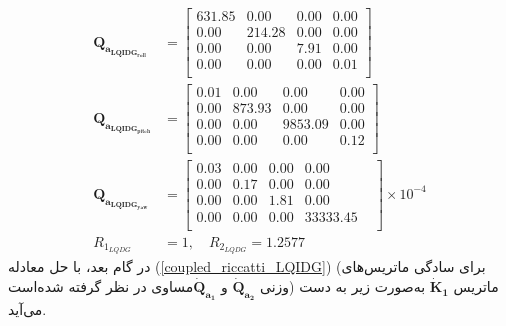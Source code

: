 \begin{equation}
	\begin{split}
				\boldsymbol{Q_{a_{LQIDG_{roll}}}} &= \begin{bmatrix}
			631.85 & 0.00 & 0.00 & 0.00  \\ 
			0.00 & 214.28 & 0.00 & 0.00  \\ 
			0.00 & 0.00 & 7.91 & 0.00  \\ 
			0.00 & 0.00 & 0.00 & 0.01  \\ 
		\end{bmatrix} \\
		\boldsymbol{Q_{a_{LQIDG_{pitch}}}} &= \begin{bmatrix}
			0.01 & 0.00 & 0.00 & 0.00  \\
			0.00 & 873.93 & 0.00 & 0.00  \\ 
			0.00 & 0.00 & 9853.09 & 0.00 \\ 
			0.00 & 0.00 & 0.00 & 0.12  \\ 
		\end{bmatrix}\\
			\boldsymbol{Q_{a_{LQIDG_{yaw}}}}  &= \begin{bmatrix}
0.03 & 0.00 & 0.00 & 0.00 & \\ 
0.00 & 0.17 & 0.00 & 0.00 & \\ 
0.00 & 0.00 & 1.81 & 0.00 & \\ 
0.00 & 0.00 & 0.00 & 33333.45 & \\
	\end{bmatrix}\times 10^{-4}\\  R_{1_{LQDG}} &= 1, \quad  R_{2_{LQDG}} = 1.2577
	\end{split}
\end{equation}
در گام بعد، با حل معادله
(\ref{coupled_riccatti_LQIDG})
(برای سادگی ماتریس‌های وزنی $\boldsymbol{\dot{Q}_{a_2}}$ و $\boldsymbol{\dot{Q}_{a_1}}$مساوی در نظر گرفته شده‌است)
ماتریس
$\boldsymbol{\dot{K}_1}$
به‌صورت زیر به دست می‌آید.
